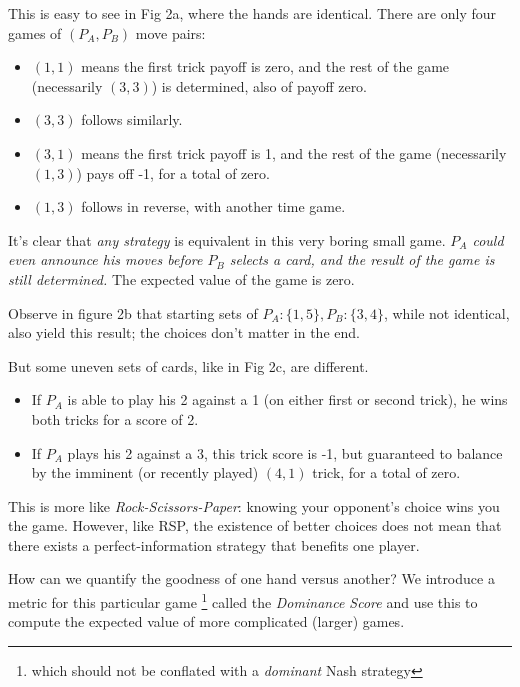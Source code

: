 \documentclass[11pt, oneside]{article} 	%
\begin{document}
This is easy to see in Fig 2a, where the hands are identical.  There are only four games of $(P_A, P_B)$ move pairs:
\begin{itemize}
\item $(1,1)$ means the first trick payoff is zero, and the rest of the game (necessarily $(3,3)$) is determined, also of payoff zero.
\item $(3,3)$ follows similarly.
\item $(3,1)$ means the first trick payoff is 1, and the rest of the game (necessarily $(1,3)$) pays off -1, for a total of zero.
\item $(1,3)$ follows in reverse, with another time game.
\end{itemize}

It's clear that \emph{any strategy} is equivalent in this very boring small game.  \emph{$P_A$ could even announce his moves before $P_B$ selects a card, and the result of the game is still determined.}  The expected value of the game is zero.

Observe in figure 2b that starting sets of $P_A: \{1,5\}, P_B: \{3,4\}$, while not identical, also yield this result; the choices don't matter in the end.

But some uneven sets of cards, like in Fig 2c, are different.
\begin{itemize}
\item If $P_A$ is able to play his 2 against a 1 (on either first or second trick), he wins both tricks for a score of 2.
\item If $P_A$ plays his 2 against a 3, this trick score is -1, but guaranteed to balance by the imminent (or recently played) $(4,1)$ trick, for a total of zero.
\end{itemize}

This is more like \emph{Rock-Scissors-Paper}: knowing your opponent's choice wins you the game.  However, like RSP, the existence of better choices does not mean that there exists a perfect-information strategy that benefits one player.

How can we quantify the goodness of one hand versus another?  We introduce a metric for this particular game \footnote{which should not be conflated with a \emph{dominant} Nash strategy} called the \emph{Dominance Score} and use this to compute the expected value of more complicated (larger) games.
\end{document}

